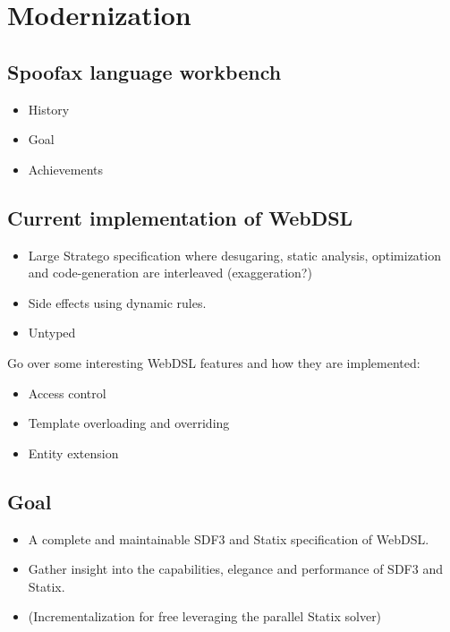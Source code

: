 
\chapter{\label{chap:modernization}Modernization}

  \section{Spoofax language workbench}

    \begin{itemize}
      \item History
      \item Goal
      \item Achievements
    \end{itemize}

  \section{Current implementation of WebDSL}

    \begin{itemize}
      \item Large Stratego specification where desugaring, static analysis, optimization and code-generation are interleaved (exaggeration?)
      \item Side effects using dynamic rules.
      \item Untyped
    \end{itemize}

    Go over some interesting WebDSL features and how they are implemented:
    \begin{itemize}
      \item Access control
      \item Template overloading and overriding
      \item Entity extension
    \end{itemize}

  \section{Goal}

    \begin{itemize}
      \item A complete and maintainable SDF3 and Statix specification of WebDSL.
      \item Gather insight into the capabilities, elegance and performance of SDF3 and Statix.
      \item (Incrementalization for free leveraging the parallel Statix solver)
    \end{itemize}
